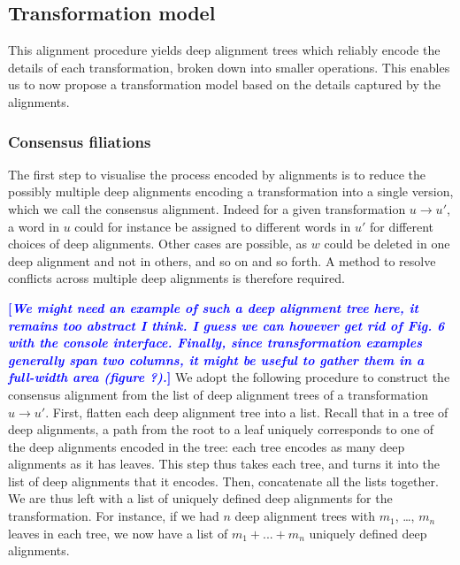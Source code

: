 \documentclass[a4paper,fleqn]{cas-dc}
\newcommand{\tb}[1]{\textcolor{blue}{#1}}
\newcommand{\rk}[1]{\tb{{\footnotesize {\bf[\emph{#1}]}}}}
\begin{document}
\subsection{Transformation model}\label{transformation-model}

This alignment procedure yields deep alignment trees which reliably encode the details of
each transformation, broken down into smaller operations. This enables us to now propose a transformation model based on the details captured by the alignments.

\subsubsection{Consensus filiations}\label{consensus-filiations}

The first step to visualise the process encoded by alignments is to
reduce the possibly multiple deep alignments encoding a transformation
into a single version, which we call the consensus alignment. Indeed for
a given transformation \(u \rightarrow u'\), a word in \(u\) could for
instance be assigned to different words in \(u'\) for different choices
of deep alignments. Other cases are possible, as \(w\) could be deleted
in one deep alignment and not in others, and so on and so forth. A
method to resolve conflicts across multiple deep alignments is therefore
required.

\rk{We might need an example of such a deep alignment tree here, it remains too abstract I think.  I guess we can however get rid of Fig. 6 with the console interface.  Finally, since transformation examples generally span two columns, it might be useful to gather them in a full-width area (figure ?).}
We adopt the following procedure to construct the consensus alignment
from the list of deep alignment trees of a transformation
\(u \rightarrow u'\). First, flatten each deep alignment tree into a
list. Recall that in a tree of deep alignments, a path from the root to
a leaf uniquely corresponds to one of the deep alignments encoded in the
tree: each tree encodes as many deep alignments as it has leaves. This
step thus takes each tree, and turns it into the list of deep alignments
that it encodes. Then, concatenate all the lists together. We are thus
left with a list of uniquely defined deep alignments for the
transformation. For instance, if we had \(n\) deep alignment trees with
\(m_1\), \ldots{}, \(m_n\) leaves in each tree, we now have a list of
\(m_1 + ... + m_n\) uniquely defined deep alignments.
\end{document}
